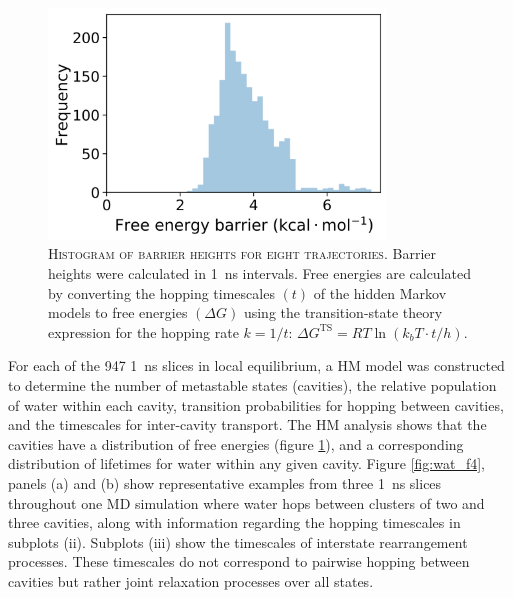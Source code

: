 \begin{figure}
    \centering
    \includegraphics[width=0.8\textwidth]{chapters/water_hopping/figures/Fig_S10.png}
    \caption[Histogram of barrier heights for eight trajectories]{\textsc{Histogram of barrier heights for eight trajectories}. Barrier heights were calculated in \SI{1}{\nano\second} intervals. Free energies are calculated by converting the hopping timescales $(t)$ of the hidden Markov models to free energies $(\Delta G)$ using the transition-state theory expression for the hopping rate $k=1/t$: $\Delta G^{\mathrm{TS}}=R T \ln \left(k_{b} T \cdot t / h\right)$.}
    \label{fig:wat_s9}
\end{figure}

For each of the \num{947} \SI{1}{\nano\second} slices in local equilibrium, a HM model was constructed to determine the number of metastable states (cavities), the relative population of water within each cavity, transition probabilities for hopping between cavities, and the timescales for inter-cavity transport. The HM analysis shows that the cavities have a distribution of free energies (figure \ref{fig:wat_s9}), and a corresponding distribution of lifetimes for water within any given cavity. Figure \ref{fig:wat_f4}, panels (a) and (b) show representative examples from three \SI{1}{\nano\second} slices throughout one MD simulation where water hops between clusters of two and three cavities, along with information regarding the hopping timescales in subplots (ii). Subplots (iii) show the timescales of interstate rearrangement processes. These timescales do not correspond to pairwise hopping between cavities but rather joint relaxation processes over all states.


